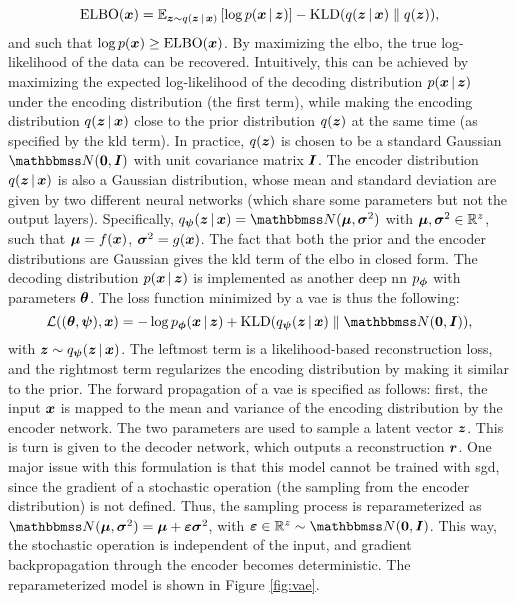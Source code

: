 $$\Fun{ELBO}(\Vector{x}) = \Expect_{\Vector{z} \sim q(\Vector{z} \given \Vector{x})}\Brack{\log p(\Vector{x} \given \Vector{z})} - \KLD{q(\Vector{z} \given \Vector{x})}{q(\Vector{z})},$$
and such that $\log p(\Vector{x}) \geq \Fun{ELBO}(\Vector{x})$. By maximizing the \gls{elbo}, the true log-likelihood of the data can be recovered. Intuitively, this can be achieved by maximizing the expected log-likelihood of the decoding distribution $p(\Vector{x} \given \Vector{z})$ under the encoding distribution (the first term), while making the encoding distribution $q(\Vector{z} \given \Vector{x})$ close to the prior distribution $q(\Vector{z})$ at the same time (as specified by the \gls{kld} term). In practice, $q(\Vector{z})$ is chosen to be a standard Gaussian $\Normal{\ZeroVector}{\Matrix{i}}$ with unit covariance matrix $\Matrix{i}$. The encoder distribution $q(\Vector{z} \given \Vector{x})$ is also a Gaussian distribution, whose mean and standard deviation are given by two different neural networks (which share some parameters but not the output layers). Specifically,
$\Encoder(\Vector{z} \given \Vector{x}) = \Normal{\MeanVec}{\StdVec}$ with $\boldsymbol{\mu},\boldsymbol{\sigma}^2 \in \mathbb{R}^z$, such that $\MeanVec = f(\Vector{x})$, $\StdVec = g(\Vector{x})$. The fact that both the prior and the encoder distributions are Gaussian gives the \gls{kld} term of the \gls{elbo} in closed form. The decoding distribution $p(\Vector{x} \given \Vector{z})$ is implemented as another deep \gls{nn} $p_{\boldsymbol{\phi}}$ with parameters $\boldsymbol{\theta}$. The loss function minimized by a \gls{vae} is thus the following:
$$\Loss((\Param, \EncParam), \Vector{x}) = - \log \Decoder(\Vector{x} \given \Vector{z}) + \KLD{\Encoder(\Vector{z} \given \Vector{x})}{\Normal{\ZeroVector}{\Matrix{i}}},$$
with $\Vector{z} \sim \Encoder(\Vector{z} \given \Vector{x})$. The leftmost term is a likelihood-based reconstruction loss, and the rightmost term regularizes the encoding distribution by making it similar to the prior. The forward propagation of a \gls{vae} is specified as follows: first, the input $\Vector{x}$ is mapped to the mean and variance of the encoding distribution by the encoder network. The two parameters are used to sample a latent vector $\Vector{z}$. This is turn is given to the decoder network, which outputs a reconstruction $\Vector{r}$. One major issue with this formulation is that this model cannot be trained with \gls{sgd}, since the gradient of a stochastic operation (the sampling from the encoder distribution) is not defined. Thus, the sampling process is reparameterized as $\Normal{\MeanVec}{\StdVec} = \MeanVec + \boldsymbol{\eps}\StdVec$, with $\boldsymbol{\eps} \in \Real^z \sim \Normal{\ZeroVector}{\Matrix{i}}$. This way, the stochastic operation is independent of the input, and gradient backpropagation through the encoder becomes deterministic. The reparameterized model is shown in Figure \ref{fig:vae}.
